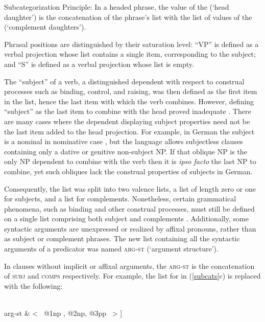\documentclass[output=paper
                ,modfonts
                ,nonflat
	        ,collection
	        ,collectionchapter
	        ,collectiontoclongg
 	        ,biblatex
                ,babelshorthands
                ,newtxmath
                ,draftmode
                ,colorlinks, citecolor=brown
]{./langsci/langscibook}
\begin{document}
\begin{exe}
\ex Subcategorization Principle: In a headed phrase, the \subcat value of the \headdtr (`head daughter') is the concatenation of the phrase's \subcat list with the list of \synsem values of the \compsdtrs (`complement daughters').
\end{exe}

\noindent
Phrasal positions are distinguished by their saturation level: ``VP'' is defined as a verbal projection whose \subcat list contains a single item, corresponding to the subject; and ``S'' is defined as a verbal projection whose  \subcat list is empty. 

The ``subject'' of a verb, a distinguished dependent with respect to construal processes such as binding, control, and raising, was then defined as the first item in the  \subcat list, hence the last item with which the verb combines.   However, defining ``subject'' as the last item to combine with the head proved inadequate \citep[Chapter~9]{pollard+sag:1994}.  There are many cases where the dependent displaying subject properties need not be the last item added to the head projection.  For example, in German the subject is a nominal in nominative case \citep{Reis82}, but the language allows subjectless clauses containing only a dative or genitive non-subject NP.  If that oblique  NP is the only NP dependent to combine with the verb then it is \emph{ipso facto} the last NP to combine, yet such obliques lack the construal properties of subjects in German.  

Consequently, the \subcat list was split into two valence lists, a \subj list of length zero or one for subjects, and a \comps list for complements.  Nonetheless, certain grammatical phenomena, such as binding and other construal processes, must still be defined on a single list comprising both subject and complements \citep{Manning+Sag:1999}. Additionally, some syntactic arguments are unexpressed or realized by affixal pronouns, rather than as subject or complement phrases.  
The new list containing all the syntactic arguments of a predicator was named \textsc{arg-st} (`argument structure').  

In clauses without implicit or affixal arguments, the \textsc{arg-st} is the concatenation of  \textsc{subj}  and \textsc{comps}  respectively.  For example, the \subcat list for  in (\ref{subcats}c) is replaced with the following:

\begin{exe} 
	\label{put}
\ex	%
\begin{avm}
[ phon & < \rm put > \\
valence & [ subj \ \ & <  \ {@1} \ > \\ 
comps \ \ & < \  {@2}, {@3} \  > ] \\ 
arg-st & < \ {@1}np , {@2}np, {@3}pp \  > ] 
\end{avm}
\end{exe}
\end{document}
